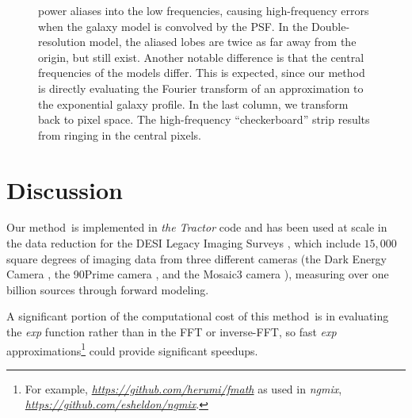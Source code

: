 \documentclass[11pt,preprint]{aastex}
\newcommand{\figref}[1]{\figurename~\ref{#1}}
\newcommand{\niceurl}[1]{\href{#1}{\textsl{#1}}}
\newcommand{\project}[1]{\textsl{#1}}
\newcommand{\trick}{method}
\begin{document}
\begin{figure}
\begin{center}
{      power aliases into the low frequencies, causing high-frequency
      errors when the galaxy model is convolved by the PSF.  In the
      Double-resolution model, the aliased lobes are twice as far away
      from the origin, but still exist.  Another notable difference is
      that the central frequencies of the models differ.  This is
      expected, since our method is directly evaluating the Fourier
      transform of an approximation to the exponential galaxy profile.
      In the last column, we transform back to pixel space.  The
      high-frequency ``checkerboard'' strip results from ringing in
      the central pixels.
    }
  \end{center}
\end{figure}


% 

\section{Discussion}

Our \trick\ is implemented in \project{the Tractor} code and has been
used at scale in the data reduction for the DESI Legacy Imaging Surveys
\citep{dey}, which include $15,000$ square degrees of imaging data from
three different cameras (the Dark Energy Camera \citep{decam},
the 90Prime camera \citep{90prime}, and the Mosaic3 camera \citep{mosaic3}),
measuring over one billion sources through forward modeling.
%

A significant portion of the computational cost of this \trick\ is in
evaluating the \emph{exp} function rather than in the FFT or
inverse-FFT, so fast \emph{exp} approximations\footnote{For example,
  \niceurl{https://github.com/herumi/fmath} as used in
  \project{ngmix}, \niceurl{https://github.com/esheldon/ngmix}.}
could provide significant speedups.

\end{document}
